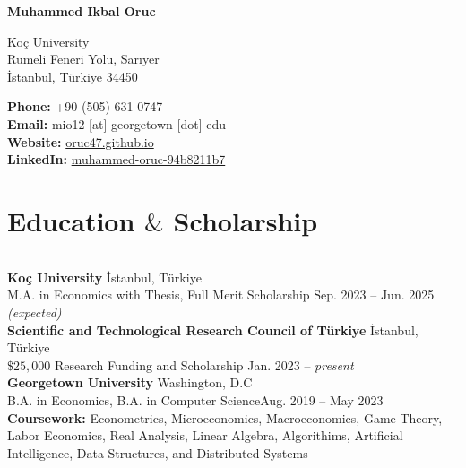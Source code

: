 \documentclass[a4paper,10pt]{article}
\newcommand{\HRule}{\rule{\linewidth}{0.5mm}}
\begin{document}
{\LARGE \textbf{Muhammed Ikbal Oruc}}
\vspace{10pt}

\noindent
\begin{spacing}{2}
    \begin{minipage}[t]{0.5\textwidth} %
        Koç University \\
        Rumeli Feneri Yolu, Sarıyer\\
        İstanbul, Türkiye 34450
    \end{minipage}%
    \begin{minipage}[t]{0.5\textwidth} %
        \raggedleft %
        \textbf{Phone:} +90 (505) 631-0747 \\
        \textbf{Email:} mio12 [at] georgetown [dot] edu \\
        \textbf{Website:} \href{https://oruc47.github.io}{oruc47.github.io}\\
        \textbf{LinkedIn:} \href{https://www.linkedin.com/in/muhammed-oruc-94b8211b7/}{muhammed-oruc-94b8211b7}
    \end{minipage}
\end{spacing}



\section*{Education $\&$ Scholarship}
\vspace{-15pt}
\HRule

\textbf{Koç University} \hfill İstanbul, Türkiye\\
M.A. in Economics with Thesis, Full Merit Scholarship \hfill Sep. 2023 – Jun. 2025 \emph{(expected)}\\[5pt]

\textbf{Scientific and Technological Research Council of Türkiye} \hfill İstanbul, Türkiye\\
$\$25,000$ Research Funding and Scholarship \hfill Jan. 2023 – \emph{present}\\[5pt]


\textbf{Georgetown University} \hfill Washington, D.C \\
B.A. in Economics, B.A. in Computer Science\hfill Aug. 2019 – May 2023 \\[5pt]

\textbf{Coursework:} Econometrics, Microeconomics, 
Macroeconomics, Game Theory, Labor Economics,
Real Analysis, Linear Algebra, Algorithims, Artificial 
Intelligence, Data Structures, and Distributed Systems
\end{document}
